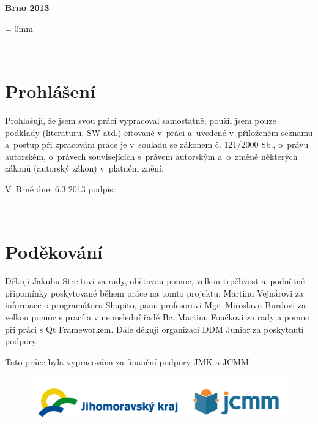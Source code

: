 \documentclass[12pt, a4paper, oneside]{article}
\newcommand{\D}{\medskip \noindent} %
\newcommand{\B}{\textbf} %
\begin{document}
\vspace{20mm}

\begin{center}
\B{Brno 2013}

\end{center}
\normalsize
\newpage  %
\voffset = 0mm %

~ %

\vspace{10mm}

\section*{Prohlášení}

Prohlašuji, že jsem svou práci vypracoval samostatně, použil jsem pouze 
podklady (literaturu, SW atd.) citované v~práci a~uvedené v~přiloženém seznamu 
a~postup při zpracování práce je v~souladu se zákonem č. 121/2000 Sb., o~právu 
autorském, o~právech souvisejících s~právem autorským a~o~změně některých 
zákonů (autorský zákon) v~platném znění. 
 
\vspace{20mm} 
 
\noindent V~Brně  dne: 6.3.2013 \hspace{50mm}                 podpis:   
 

\newpage   %

~ %
\vspace{100mm}

\section*{Poděkování}
Děkují Jakubu Streitovi za rady, obětavou pomoc, velkou trpělivost a~podnětné připomínky poskytované během práce na tomto projektu, Martinu Vejnárovi za informace o programátoru Shupito, panu profesorovi Mgr. Miroslavu Burdovi za velkou pomoc s prací a v neposlední řadě Bc. Martinu Foučkovi za rady a pomoc při práci s Qt Frameworkem. Dále děkuji organizaci DDM Junior za poskytnutí podpory.

\D Tato práce byla vypracována za finanční podpory JMK a JCMM.

\begin{figure}[H]
\begin{center}
\includegraphics[width=\textwidth]{img/jcmm.png}
\end{center}
\end{figure}
 
\end{document}
